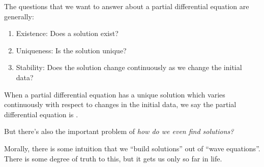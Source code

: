 \begin{node}\label{pde-000C}%
The questions that we want to answer about a partial differential
equation are generally:
\begin{enumerate}
\item Existence: Does a solution exist?
\item Uniqueness: Is the solution unique?
\item Stability: Does the solution change continuously as we change the initial data?
\end{enumerate}
When a partial differential equation has a unique solution which varies
continuously with respect to changes in the initial data, we say the
partial differential equation is .

But there's also the important problem of \emph{how do we even find solutions?}
\begin{node}\label{pde-000B}%
Morally, there is some intuition that we ``build solutions'' out of
``wave equations''. There is some degree of truth to this, but it gets
us only so far in life.
\end{node}
\end{node}

